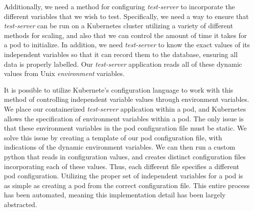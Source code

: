 Additionally, we need a method for configuring
\textit{test-server} to incorporate the different variables that we wish to
test. Specifically, we need a way to ensure that \textit{test-server} can be run
on a Kubernetes cluster utilizing a variety of different methods for scaling,
and also that we can control the amount of time it takes for a pod to
initialize. In addition, we need \textit{test-server} to know the exact values
of its independent variables so that it can record them to the database,
ensuring all data is properly labelled. Our \textit{test-server} application
reads all of these dynamic values from Unix \textit{environment} variables.

It is possible to utilize Kubernete's configuration language to work with this
method of controlling independent variable values through environment variables.
We place our containerized \textit{test-server} application within a pod, and
Kubernetes allows the specification of environment variables within a pod. The
only issue is that these environment variables in the pod configuration file
must be static. We solve this issue by creating a template of our pod
configuration file, with indications of the dynamic environment variables. We
can then run a custom python that reads in configuration values, and creates
distinct configuration files incorporating each of these values. Thus, each
different file specifies a different pod configuration. Utilizing the proper
set of independent variables for a pod is as simple as creating a pod from the
correct configuration file. This entire process has been automated, meaning this
implementation detail has been largely abstracted.
